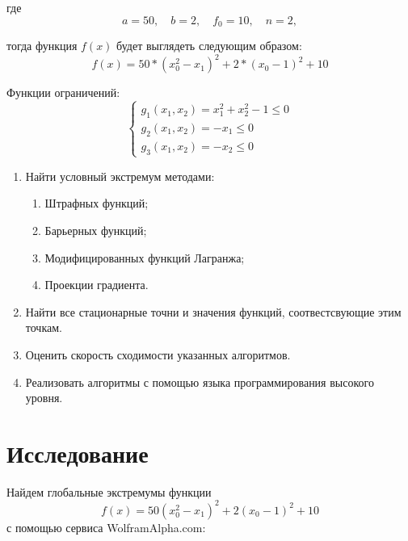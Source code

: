 \documentclass[a4paper, 12pt]{article}   	%
\begin{document}
    где 
    \begin{equation}
        a = 50, \quad b = 2, \quad f_0 = 10, \quad n = 2,
    \end{equation}
    
    тогда функция $f(x)$ будет выглядеть следующим образом:
    \begin{equation}
        f(x) = 50 * (x_0^2 - x_1)^2 + 2 * (x_0 - 1)^2 + 10
    \end{equation}
    
    Функции ограничений:
    \begin{equation}
        \begin{cases}
            g_1(x_1, x_2) = x_1^2+x_2^2 - 1 \leq 0 \\
            g_2(x_1, x_2) = -x_1 \leq 0 \\
            g_3(x_1, x_2) = -x_2 \leq 0
        \end{cases}
    \end{equation}
    

    \begin{enumerate}
        \item Найти условный экстремум методами:
        \begin{enumerate}
            \item Штрафных функций;
            \item Барьерных функций;
            \item Модифицированных функций Лагранжа;
            \item Проекции градиента.
        \end{enumerate}
        \item Найти все стационарные точни и значения функций, соотвестсвующие этим точкам. 
        \item Оценить скорость сходимости указанных алгоритмов.
        \item Реализовать алгоритмы с помощью языка программирования высокого уровня.
    \end{enumerate}
    

\newpage
\section{Исследование}
    Найдем глобальные экстремумы функции 
    \begin{equation}
         f(x) = 50(x_0^2 - x_1)^2 + 2(x_0 - 1)^2 + 10
    \end{equation}
    с помощью сервиса WolframAlpha.com:
    
\end{document}
